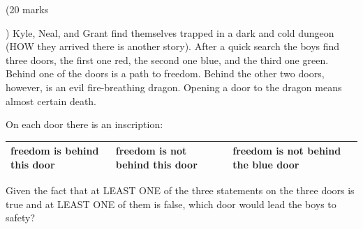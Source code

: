 \begin{problem}(20 marks\addtocounter{marks}{20})
Kyle, Neal, and Grant find themselves trapped in a dark and cold dungeon
(HOW they arrived there is another story). After a quick search the boys find
three doors, the first one red, the second one blue, and the third one green.
Behind one of the doors is a path to freedom. Behind the other two doors,
however, is an evil fire-breathing dragon. Opening a door to the dragon means
almost certain death.

On each door there is an inscription:
\bgroup
\def\arraystretch{1.5}
\begin{tabular}{|p{0.5in}|p{0.5in}|p{0.5in}|}
  \hline
  \cellcolor{red!25}freedom is behind this door
 & \cellcolor{blue!25}freedom is not behind this door
 & \cellcolor{green!25}freedom is not behind the blue door\\
  \hline
\end{tabular}
\egroup

Given the fact that at LEAST ONE of the three statements on the three doors
is true and at LEAST ONE of them is false, which door would lead the boys to
safety?
\end{problem}
